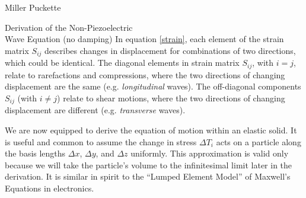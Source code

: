 \documentclass[a4paper,10pt]{report}
\numberwithin{equation}{section}
\begin{document}
\begin{chapter}{Miller Puckette}
\begin{section}{Derivation of the Non-Piezoelectric \\ Wave Equation (no damping)}
In equation \eqref{strain}, each element of the strain matrix $S_{ij}$ describes
changes in displacement for combinations of two 
directions, which could be identical. The diagonal elements in strain matrix $S_{ij}$, with $i=j$, relate to rarefactions and compressions, where the two directions of changing displacement are the same 
(e.g. \emph{longitudinal} waves). The off-diagonal components $S_{ij}$ (with  $i
\neq j$) relate to shear motions, where the two directions of changing
displacement are different (e.g. \emph{transverse} waves). \cite[14]{Ballantine1997}

We are now equipped to derive the equation of motion within an elastic solid.
It is useful and common to assume the change in stress $ \Delta T_i$ acts on a
particle along the basis lengths $ \Delta x$, $ \Delta y$, 
and $ \Delta z$ uniformly. This approximation is valid only because we will take the particle's volume to the infinitesimal limit later in the derivation. It is similar in spirit to the ``Lumped Element Model'' of Maxwell's Equations in electronics.


\end{section}
\end{chapter}
\end{document}
